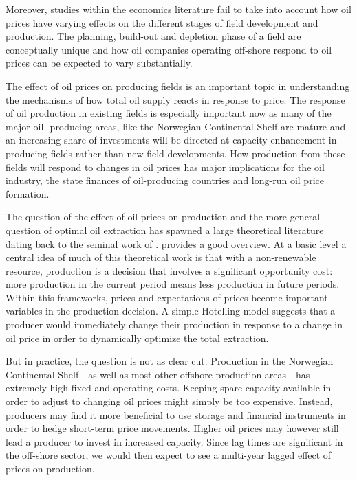 \documentclass[11pt]{article}
\begin{document}
Moreover, studies within the economics literature fail to take into account how oil prices have varying effects on the different stages of field development and production.  The planning, build-out and depletion phase of a field are conceptually unique and how oil companies operating off-shore respond to oil prices can be expected to vary substantially.

The effect of oil prices on producing fields is an important topic in understanding the mechanisms of how total oil supply reacts in response to price. The response of oil production in existing fields is especially important now as many of the major oil- producing areas, like the Norwegian Continental Shelf are mature and an increasing share of investments will be directed at capacity enhancement in producing fields rather than new field developments. How production from these fields will respond to changes in oil prices has major implications for the oil industry, the state finances of oil-producing countries and long-run oil price formation.

The question of the effect of oil prices on production and the more general question of optimal oil extraction has spawned a large theoretical literature dating back to the seminal work of \citet{hotelling_economics_1931}. \citet{krautkraemer_nonrenewable_1998} provides a good overview. At a basic level a central idea of much of this theoretical work is that with a non-renewable resource, production is a decision that involves a significant opportunity cost: more production in the current period means less production in future periods.  Within this frameworks, prices and expectations of prices become important variables in the production decision. A simple Hotelling model suggests that a producer would immediately change their production in response to a change in oil price in order to dynamically optimize the total extraction.

But in practice, the question is not as clear cut.  Production in the Norwegian Continental Shelf - as well as most other offshore production areas - has extremely high fixed and operating costs.  Keeping spare capacity available in order to adjust to changing oil prices might simply be too expensive.  Instead, producers may find it more beneficial to use storage and financial instruments in order to hedge short-term price movements. Higher oil prices may however still lead a producer to invest in increased capacity.  Since lag times are significant in the off-shore sector, we would then expect to see a multi-year lagged effect of prices on production.  
\end{document}
